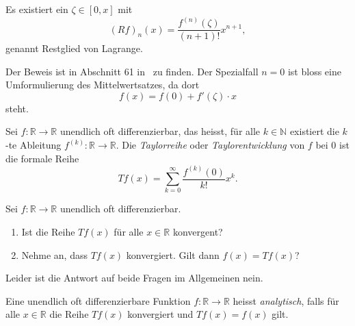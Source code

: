 \documentclass[../main.tex]{subfiles}
\begin{document}
\begin{zusatz}
  Es existiert ein $\zeta \in [0, x]$ mit 
  \[
    {(Rf)}_n(x) = \frac{f^{(n)}(\zeta)}{(n+1)!}x^{n+1},
  \]
  genannt Restglied von Lagrange.
\end{zusatz}

Der Beweis ist in Abschnitt 61 in~\cite{heuser} zu finden.
Der Spezialfall $n = 0$ ist bloss eine Umformulierung des Mittelwertsatzes,
da dort
\[
  f(x) = f(0) + f'(\zeta) \cdot x
\]
steht.

\begin{definition}
  Sei $f \colon \mathbb{R} \to \mathbb{R}$ unendlich oft differenzierbar,
  das heisst, für alle $k \in \mathbb{N}$ existiert die $k$-te Ableitung
  $f^{(k)} \colon \mathbb{R} \to \mathbb{R}$.
  Die \emph{Taylorreihe} oder \emph{Taylorentwicklung} von $f$ bei $0$ ist die formale Reihe
  \[
    Tf(x) = \sum_{k=0}^{\infty} \frac{f^{(k)}(0)}{k!}x^k.
  \]
\end{definition}

\begin{questions}
  Sei $f \colon \mathbb{R} \to \mathbb{R}$ unendlich oft
  differenzierbar.
  \begin{enumerate}[(1)]
    \item Ist die Reihe $Tf(x)$ für alle $x \in \mathbb{R}$ konvergent?
    \item Nehme an, dass $Tf(x)$ konvergiert. Gilt dann $f(x) = Tf(x)$?
  \end{enumerate}
\end{questions}

Leider ist die Antwort auf beide Fragen im Allgemeinen nein.

\begin{definition}
  Eine unendlich oft differenzierbare Funktion
  $f \colon \mathbb{R} \to \mathbb{R}$ heisst \emph{analytisch},
  falls für alle $x \in \mathbb{R}$ die Reihe
  $Tf(x)$ konvergiert und $Tf(x) = f(x)$ gilt.
\end{definition}
\end{document}
